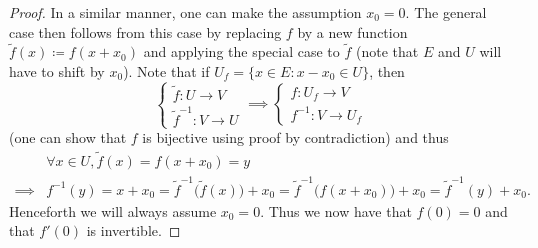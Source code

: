 \begin{proof}
    In a similar manner, one can make the assumption \(x_0 = 0\).
    The general case then follows from this case by replacing \(f\) by a new function
    \(\tilde{f}(x) \coloneqq f(x + x_0)\) and applying the special case to \(\tilde{f}\)
    (note that \(E\) and \(U\) will have to shift by \(x_0\)).
    Note that if \(U_f = \{x \in E : x - x_0 \in U\}\), then
    \[
        \begin{cases}
            \tilde{f} : U \to V \\
            \tilde{f}^{-1} : V \to U
        \end{cases} \implies \begin{cases}
            f : U_f \to V \\
            f^{-1} : V \to U_f
        \end{cases}
    \]
    (one can show that \(f\) is bijective using proof by contradiction)
    and thus
    \begin{align*}
                 & \forall x \in U, \tilde{f}(x) = f(x + x_0) = y                                                                                         \\
        \implies & f^{-1}(y) = x + x_0 = \tilde{f}^{-1}\big(\tilde{f}(x)\big) + x_0 = \tilde{f}^{-1}\big(f(x + x_0)\big) + x_0 = \tilde{f}^{-1}(y) + x_0.
    \end{align*}
    Henceforth we will always assume \(x_0 = 0\).
    Thus we now have that \(f(0) = 0\) and that \(f'(0)\) is invertible.


\end{proof}
